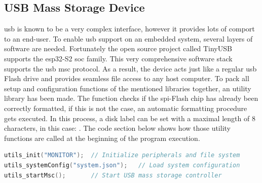 \subsection{USB Mass Storage Device}
\acrshort{usb} is known to be a very complex interface, however it provides lots of comport to an end-user. To enable \acrshort{usb} support on an embedded system, several layers of software are needed. Fortunately the open source project called TinyUSB supports the \gls{esp32}-S2 \acrshort{soc} family. This very comprehensive software stack supports the \acrshort{usb} \acrfull{msc} protocol.
As a result, the device acts just like a regular \acrshort{usb} Flash drive and provides seamless file access to any host computer. \newline
To pack all setup and configuration functions of the mentioned libraries together, an utility library has been made. The  function checks if the \acrshort{spi}-Flash chip has already been correctly formatted, if this is not the case, an automatic formatting procedure gets executed. In this process, a disk label can be set with a maximal length of 8 characters, in this case: . The code section below shows how those utility functions are called at the beginning of the program execution.

\bigskip
{}
\begin{lstlisting}[backgroundcolor=\color{gray!10},  
                   basicstyle=\ttfamily,
                   columns=fullflexible,
                   breakatwhitespace=false,      
                   breaklines=true,                
                   captionpos=b,                    
                   commentstyle=\color{mygreen}, 
                   extendedchars=true,              
                   frame=single,                   
                   keepspaces=true,             
                   keywordstyle=\color{blue},      
                   language=c++,                 
                   numbers=none,                
                   numbersep=5pt,                   
                   numberstyle=\tiny\color{blue}, 
                   rulecolor=\color{mygray},        
                   showspaces=false,
                   showstringspaces=false,
                   showtabs=false,                 
                   stepnumber=5,                  
                   stringstyle=\color{mymauve},    
                   tabsize=2,                      
                   title=\lstname,
                   frame=none,
                   xleftmargin = 1cm,
                   framexleftmargin = 1em]
utils_init("MONITOR");  // Initialize peripherals and file system
utils_systemConfig("system.json");   // Load system configuration
utils_startMsc();       // Start USB mass storage controller
\end{lstlisting}

